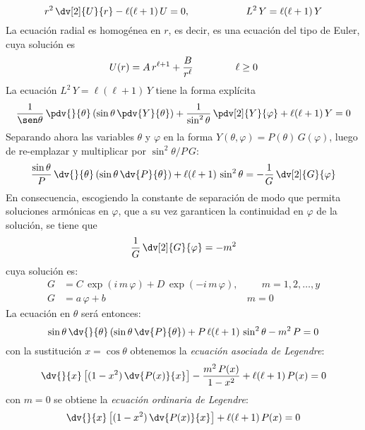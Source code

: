 \[ r^{2} \, \dv[2]{U}{r} - \ell (\ell + 1) \, U = 0, \hspace{2cm} L^{2} \, Y = \ell(\ell + 1) \, Y  \]
La ecuación radial es homogénea en $r$, es decir, es una ecuación del tipo de Euler, cuya solución es
\[ U(r) = A \, r^{\ell +1} + \dfrac{B}{r^{\ell}} \hspace{1.5cm} \ell \geq 0 \]
La ecuación $L^{2} \, Y = \ell (\ell + 1) \, Y$ tiene la forma explícita
\[ \dfrac{1}{\sen \theta} \, \pdv{}{\theta} \left( \sin \theta \, \pdv{Y}{\theta} \right) + \dfrac{1}{\sin^{2} \theta} \, \pdv[2]{Y}{\varphi} + \ell (\ell +1) \, Y = 0 \]
Separando ahora las variables $\theta$ y $\varphi$ en la forma $Y(\theta, \varphi) = P(\theta) \, G(\varphi)$, luego de re-emplazar y multiplicar por $\sin^{2} \theta / P \, G$:
\[ \dfrac{\sin \theta}{P} \, \dv{}{\theta} \left( \sin \theta \, \dv{P}{\theta} \right) + \ell (\ell + 1) \, \sin^{2} \theta = - \dfrac{1}{G} \, \dv[2]{G}{\varphi}  \]
En consecuencia, escogiendo la constante de separación de modo que permita soluciones armónicas en $\varphi$, que a su vez garanticen la continuidad en $\varphi$ de la solución, se tiene que
\[ \dfrac{1}{G} \, \dv[2]{G}{\varphi} = -m^{2} \]
cuya solución es:
\begin{align*}
G &= C \, \exp(i \, m \, \varphi) + D \, \exp(-i \, m \, \varphi), \hspace{1cm} m = 1, 2, \ldots, y \\
G &= a \, \varphi + b \hspace{6cm} m = 0
\end{align*}
La ecuación en $\theta$ será entonces:
\[ \sin \theta \, \dv{}{\theta} \left( \sin \theta \, \dv{P}{\theta} \right) + P \, \ell (\ell + 1) \, \sin^{2} \theta - m^{2} \, P = 0 \]
con la sustitución $x = \cos \theta$ obtenemos la \emph{ecuación asociada de Legendre}:
\[ \dv{}{x} \left[ (1 -x^{2}) \, \dv{P(x)}{x} \right] - \dfrac{m^{2} \, P(x)}{1- x^{2}} + \ell (\ell + 1) \, P(x) = 0 \]
con $m=0$ se obtiene la \emph{ecuación ordinaria de Legendre}:
\[ \dv{}{x} \left[ (1 -x^{2}) \, \dv{P(x)}{x} \right] + \ell (\ell + 1) \, P(x) = 0 \]
